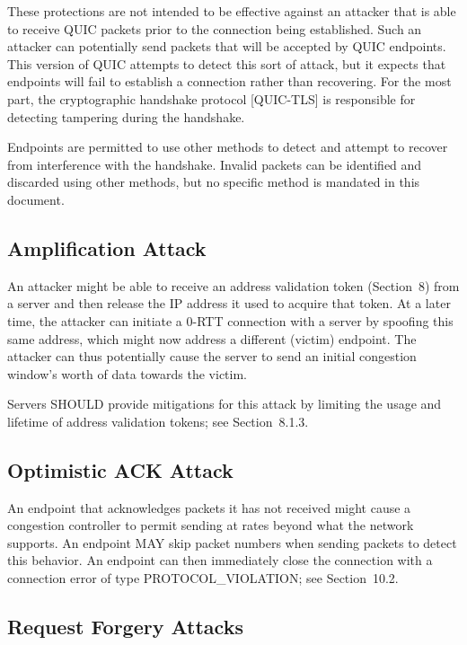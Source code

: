 \documentclass{article}
\begin{document}
These protections are not intended to be effective against an attacker that is able to receive QUIC packets prior to the connection being established.  Such an attacker can potentially send packets that will be accepted by QUIC endpoints.  This version of QUIC attempts to detect this sort of attack, but it expects that endpoints will fail to establish a connection rather than recovering.  For the most part, the cryptographic handshake protocol [QUIC-TLS] is responsible for detecting tampering during the handshake.

Endpoints are permitted to use other methods to detect and attempt to recover from interference with the handshake.  Invalid packets can be identified and discarded using other methods, but no specific method is mandated in this document.

\subsection{Amplification Attack}

An attacker might be able to receive an address validation token (Section~8) from a server and then release the IP address it used to acquire that token.  At a later time, the attacker can initiate a 0-RTT connection with a server by spoofing this same address, which might now address a different (victim) endpoint.  The attacker can thus potentially cause the server to send an initial congestion window's worth of data towards the victim.

Servers SHOULD provide mitigations for this attack by limiting the usage and lifetime of address validation tokens; see Section~8.1.3.

\subsection{Optimistic ACK Attack}

An endpoint that acknowledges packets it has not received might cause a congestion controller to permit sending at rates beyond what the network supports.  An endpoint MAY skip packet numbers when sending packets to detect this behavior.  An endpoint can then immediately close the connection with a connection error of type PROTOCOL\_VIOLATION; see Section~10.2.

\subsection{Request Forgery Attacks}
\end{document}
